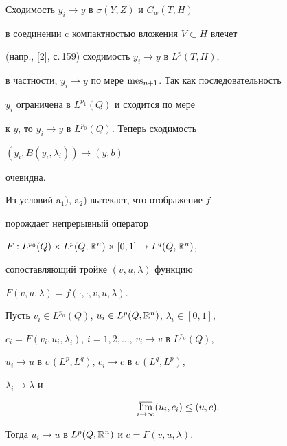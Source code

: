  


\begin{pf} 


Сходимость $y_i\to y$ в $\sigma(Y,Z)$ и $C_w(T,H)$ 


в соединении c компактностью вложения $V\subset H$ влечет 


(напр., [2], с.\,159) сходимость $y_i\to y$ в $L^p(T,H)$, 


в частности, $y_i\to y$ по мере $\operatorname{mes}_{n+1}$. Так как последовательность 


$y_i$ ограничена в $L^{p_1}(Q)$ и сходится по мере 


к $y$, то $y_i\to y$ в $L^{p_0}(Q)$. Теперь сходимость 


$(y_i,B(y_i,\lambda_i))\to(y,b)$ 


очевидна. 


\end{pf} 


 


Из условий $\mathrm a_1$), $\mathrm a_2$) вытекает, что отображение $f$ 


порождает непрерывный оператор 


$F:L^{p_0}(Q)\times L^p(Q,\Bbb R^n)\times[0,1]\to L^q(Q,\Bbb R^n)$, 


сопоставляющий тройке $(v,u,\lambda)$ функцию 


$F(v,u,\lambda)=f(\cdot,\cdot,v,u,\lambda)$. 


 


\begin{lem} 


Пусть $v_i\in L^{p_0}(Q)$, $u_i\in L^p(Q,\Bbb R^n)$, $\lambda_i\in[0,1]$, 


$c_i=F(v_i,u_i,\lambda_i)$, $i=1,2,\dotsc$, $v_i\to v$ в $L^{p_0}(Q)$, 


$u_i\to u$ в $\sigma(L^p,L^q)$, $c_i\to c$ в $\sigma(L^q,L^p)$, 


$\lambda_i\to\lambda$ и 


\begin{equation} 


\underset{i\to\infty}{\varlimsup}{}(u_i,c_i)\le(u,c). 


\end{equation} 


Тогда $u_i\to u$ в $L^p(Q,\Bbb R^n)$ и $c=F(v,u,\lambda)$. 


\end{lem} 


